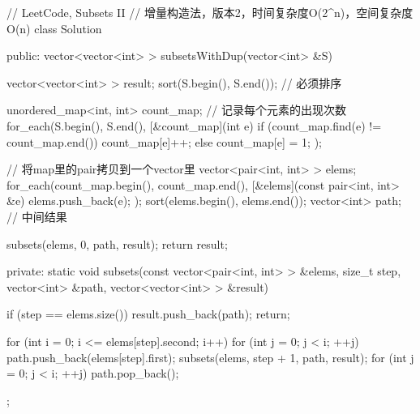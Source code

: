 \begin{Code}
// LeetCode, Subsets II
// 增量构造法，版本2，时间复杂度O(2^n)，空间复杂度O(n)
class Solution {
public:
    vector<vector<int> > subsetsWithDup(vector<int> &S) {
        vector<vector<int> > result;
        sort(S.begin(), S.end()); // 必须排序

        unordered_map<int, int> count_map; // 记录每个元素的出现次数
        for_each(S.begin(), S.end(), [&count_map](int e) {
            if (count_map.find(e) != count_map.end())
                count_map[e]++;
            else
                count_map[e] = 1;
        });

        // 将map里的pair拷贝到一个vector里
        vector<pair<int, int> > elems;
        for_each(count_map.begin(), count_map.end(),
                [&elems](const pair<int, int> &e) {
                    elems.push_back(e);
                });
        sort(elems.begin(), elems.end());
        vector<int> path; // 中间结果

        subsets(elems, 0, path, result);
        return result;
    }

private:
    static void subsets(const vector<pair<int, int> > &elems,
            size_t step, vector<int> &path, vector<vector<int> > &result) {
        if (step == elems.size()) {
            result.push_back(path);
            return;
        }

        for (int i = 0; i <= elems[step].second; i++) {
            for (int j = 0; j < i; ++j) {
                path.push_back(elems[step].first);
            }
            subsets(elems, step + 1, path, result);
            for (int j = 0; j < i; ++j) {
                path.pop_back();
            }
        }
    }
};
\end{Code}


